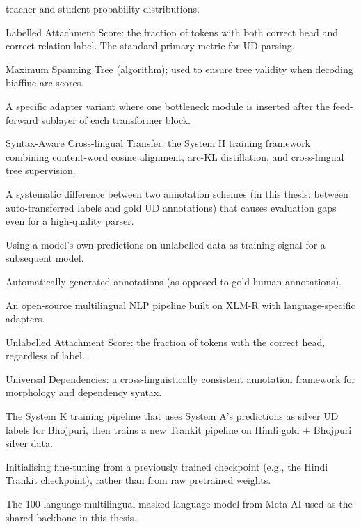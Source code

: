 \documentclass[12pt,a4paper,oneside]{report}
\begin{document}
\begin{description}
        teacher and student probability distributions.
  \item[LAS] Labelled Attachment Score: the fraction of tokens with both
        correct head and correct relation label. The standard primary metric
        for UD parsing.
  \item[MST] Maximum Spanning Tree (algorithm); used to ensure tree validity
        when decoding biaffine arc scores.
  \item[Pfeiffer adapter] A specific adapter variant where one bottleneck
        module is inserted after the feed-forward sublayer of each
        transformer block.
  \item[SACT] Syntax-Aware Cross-lingual Transfer: the System H training
        framework combining content-word cosine alignment, arc-KL distillation,
        and cross-lingual tree supervision.
  \item[Schema mismatch] A systematic difference between two annotation
        schemes (in this thesis: between auto-transferred labels and gold UD
        annotations) that causes evaluation gaps even for a high-quality
        parser.
  \item[Self-training] Using a model's own predictions on unlabelled data as
        training signal for a subsequent model.
  \item[Silver labels] Automatically generated annotations (as opposed to
        gold human annotations).
  \item[Trankit] An open-source multilingual NLP pipeline built on XLM-R
        with language-specific adapters.
  \item[UAS] Unlabelled Attachment Score: the fraction of tokens with the
        correct head, regardless of label.
  \item[UD] Universal Dependencies: a cross-linguistically consistent
        annotation framework for morphology and dependency syntax.
  \item[UD-Bridge] The System K training pipeline that uses System A's
        predictions as silver UD labels for Bhojpuri, then trains a new
        Trankit pipeline on Hindi gold + Bhojpuri silver data.
  \item[Warm-start fine-tuning] Initialising fine-tuning from a previously
        trained checkpoint (e.g., the Hindi Trankit checkpoint), rather than
        from raw pretrained weights.
  \item[XLM-R / XLM-RoBERTa] The 100-language multilingual masked language
        model from Meta AI used as the shared backbone in this thesis.
\end{description}





\end{document}

